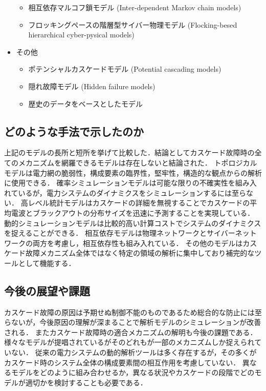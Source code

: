 \documentclass[a4paper,11pt]{jsarticle}
\begin{document}
\begin{itemize}
\begin{itemize}
        \item 相互依存マルコフ鎖モデル (Inter-dependent Markov chain models)
        \item フロッキングペースの階層型サイバー物理モデル (Flocking-besed hierarchical cyber-pysical models)
      \end{itemize}
      \item その他
      \begin{itemize}
        \item ポテンシャルカスケードモデル (Potential cascading models)
        \item 隠れ故障モデル (Hidden failure models)
        \item 歴史のデータをベースとしたモデル
      \end{itemize}
    \end{itemize}
    \subsection{どのような手法で示したのか}
    上記のモデルの長所と短所を挙げて比較した．結論としてカスケード故障時の全てのメカニズムを網羅できるモデルは存在しないと結論された．
    トポロジカルモデルは電力網の脆弱性，構成要素の臨界性，堅牢性，構造的な観点からの解析に使用できる．
    確率シミュレーションモデルは可能な限りの不確実性を組み入れているが，電力システムのダイナミクスをシミュレーションするには至らない．
    高レベル統計モデルはカスケードの詳細を無視することでカスケードの平均電波とブラックアウトの分布サイズを迅速に予測することを実現している．
    動的シミュレーションモデルは比較的高い計算コストでシステムのダイナミクスを捉えることができる．
    相互依存モデルは物理ネットワークとサイバーネットワークの両方を考慮し，相互依存性も組み入れている．
    その他のモデルはカスケード故障メカニズム全体ではなく特定の領域の解析に集中しており補完的なツールとして機能する．
    \subsection{今後の展望や課題}
    カスケード故障の原因は予期せぬ制御不能のものであるため総合的な防止には至らないが，今後原因の理解が深まることで解析モデルのシミュレーションが改善される．
    またカスケード故障時の適合メカニズムの解明も今後の課題である．
    様々なモデルが提唱されているがそのどれもが一部のメカニズムしか捉えられていない．
    従来の電力システムの動的解析ツールは多く存在するが，その多くがカスケード時のシステム全体の構成要素間の相互作用を考慮していない．
    異なるモデルをどのように組み合わせるか，異なる状況やカスケードの段階でどのモデルが適切かを検討することも必要である．
\end{document}
